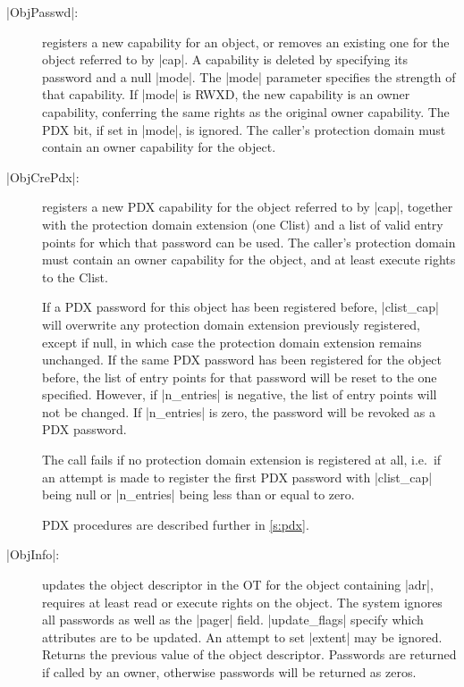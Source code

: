 \documentclass[a4paper,11pt,twoside,dvips]{report}
\begin{document}
\begin{description}
\item[|ObjPasswd|:] registers a new capability for an object, or removes
an existing one for the object referred to by |cap|. A capability is
deleted by specifying its password and a null |mode|. The |mode|
parameter specifies the strength of that capability. If |mode| is RWXD,
the new capability is an owner capability, conferring the same rights as
the original owner capability. The PDX bit, if set in |mode|, is
ignored. The caller's protection domain must contain an owner capability
for the object.

\item[|ObjCrePdx|:] registers a new PDX capability for the object
referred to by |cap|, together with the protection domain extension (one
Clist) and a list of valid entry points for which that password can be
used. The caller's protection domain must contain an owner capability
for the object, and at least execute rights to the Clist.

If a PDX password for this object has been registered before,
|clist\_cap| will overwrite any protection domain extension previously
registered, except if null, in which case the protection domain
extension remains unchanged. If the same PDX password has been
registered for the object before, the list of entry points for that
password will be reset to the one specified. However, if |n\_entries| is
negative, the list of entry points will not be changed. If |n\_entries|
is zero, the password will be revoked as a PDX password.

The call fails if no protection domain extension is registered at all,
i.e.\ if an attempt is made to register the first PDX password with
|clist\_cap| being null or |n\_entries| being less than or equal to zero.

PDX procedures are described further in \autoref{s:pdx}.

\item[|ObjInfo|:] updates the object descriptor in the OT for the object
containing |adr|, requires at least read or execute rights on the
object. The system ignores all passwords as well as the |pager|
field. |update\_flags| specify which attributes are to be updated.  An
attempt to set |extent| may be ignored. Returns the previous value of
the object descriptor. Passwords are returned if called by an owner,
otherwise passwords will be returned as zeros.



\end{description}
\end{document}
